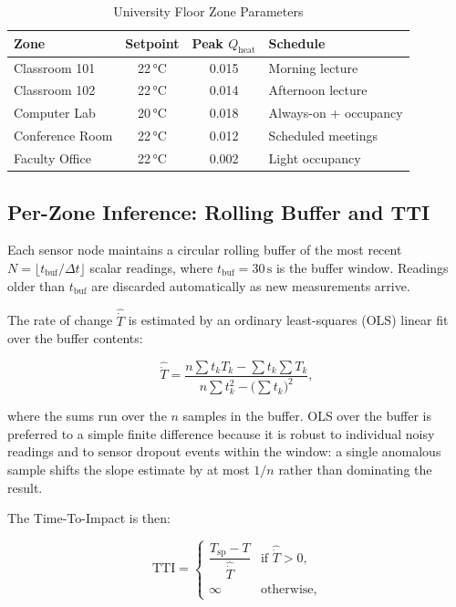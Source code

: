 \documentclass[conference]{IEEEtran}
\begin{document}
\begin{table}[t]
\centering
\caption{University Floor Zone Parameters}
\label{tab:zones}
\begin{tabular}{lccl}
\toprule
\textbf{Zone} & \textbf{Setpoint} & \textbf{Peak $Q_{\text{heat}}$}
              & \textbf{Schedule} \\
\midrule
Classroom 101    & 22\,°C & 0.015 & Morning lecture \\
Classroom 102    & 22\,°C & 0.014 & Afternoon lecture \\
Computer Lab     & 20\,°C & 0.018 & Always-on + occupancy \\
Conference Room  & 22\,°C & 0.012 & Scheduled meetings \\
Faculty Office   & 22\,°C & 0.002 & Light occupancy \\
\bottomrule
\end{tabular}
\end{table}

\subsection{Per-Zone Inference: Rolling Buffer and TTI}

Each sensor node maintains a circular rolling buffer of the most recent
$N = \lfloor t_{\text{buf}} / \Delta t \rfloor$ scalar readings, where
$t_{\text{buf}} = 30\,\text{s}$ is the buffer window.  Readings older than
$t_{\text{buf}}$ are discarded automatically as new measurements arrive.

The rate of change $\hat{\dot{T}}$ is estimated by an ordinary least-squares
(OLS) linear fit over the buffer contents:

\begin{equation}
  \hat{\dot{T}} = \frac{n \sum t_k T_k - \sum t_k \sum T_k}
                       {n \sum t_k^2 - \bigl(\sum t_k\bigr)^2},
  \label{eq:ols}
\end{equation}

where the sums run over the $n$ samples in the buffer.  OLS over the buffer is
preferred to a simple finite difference because it is robust to individual
noisy readings and to sensor dropout events within the window: a single
anomalous sample shifts the slope estimate by at most $1/n$ rather than
dominating the result.

The Time-To-Impact is then:

\begin{equation}
  \text{TTI} = \begin{cases}
    \dfrac{T_{\text{sp}} - T}{\hat{\dot{T}}} & \text{if } \hat{\dot{T}} > 0, \\[6pt]
    \infty & \text{otherwise,}
  \end{cases}
  \label{eq:tti}
\end{equation}
\end{document}
